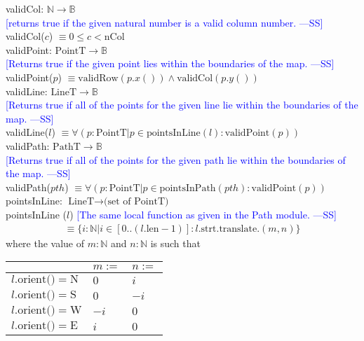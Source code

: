 \documentclass[12pt]{article}
\newcommand{\authornote}[3]{\textcolor{#1}{[#3 ---#2]}}
\newcommand{\authornote}[3]{}
\newcommand{\wss}[1]{\authornote{blue}{SS}{#1}}
\begin{document}
\noindent validCol: $\mathbb{N} \rightarrow \mathbb{B}$\\
\noindent \wss{returns true if the given natural number is a valid column
  number.}\\ validCol($c$) $ \equiv 0 \leq c < \mbox{nCol} $ \\

\noindent validPoint: $\mbox{PointT} \rightarrow \mathbb{B}$\\
\noindent \wss{Returns true if the given point lies within the boundaries of the
  map.}\\ validPoint($p$) $\equiv \mbox{validRow}(p.x()) \land \mbox{validCol}(p.y())$ \\

\noindent validLine: $\mbox{LineT} \rightarrow \mathbb{B}$\\
\noindent \wss{Returns true if all of the points for the given line lie within the boundaries of the
  map.}\\ validLine($l$) $\equiv \forall (p : \mbox{PointT} | p \in \mbox{pointsInLine}(l): \mbox{validPoint}(p))$ \\

\noindent validPath: $\mbox{PathT} \rightarrow \mathbb{B}$\\
\noindent \wss{Returns true if all of the points for the given path lie within the boundaries of the
  map.}\\ validPath($pth$) $\equiv \forall (p : \mbox{PointT} | p \in \mbox{pointsInPath}(pth): \mbox{validPoint}(p))$ \\

\noindent pointsInLine: $\mbox{LineT} \rightarrow \mbox{(set of PointT)}$\\
\noindent pointsInLine ($l$) 
\wss{The same local function as given in the Path module.} \\
\begin{multline*}
\equiv \{ i: \mathbb{N} | i \in [0
  .. (l.\mbox{len} - 1)] : l.\mbox{strt}.\mbox{translate}.(m,n)\}
\end{multline*}
where the value of $m: \mathbb{N}$ and $n: \mathbb{N}$ is such that \\

\begin{tabular}{|l|l|l|}
\hline
& $m :=  $& $n := $  \\
\hline
$l.\mbox{orient()} = \mbox{N}$ & $0 $& $i$  \\
\hline
$l.\mbox{orient()}  = \mbox{S}$ & $0$ & $-i$ \\
\hline
$l.\mbox{orient()}  = \mbox{W}$ & $ -i$ & $ 0$ \\
\hline
$l.\mbox{orient()} = \mbox{E}$ & $ i$ & $ 0$ \\
\hline
\end{tabular}
\\ \\
\end{document}
